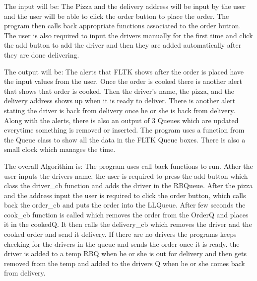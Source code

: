 \begin{DoxyItemize}
\item The input will be\+: The Pizza and the delivery address will be input by the user and the user will be able to click the order button to place the order. The program then calls back appropriate functions associated to the order button. The user is also required to input the drivers manually for the first time and click the add button to add the driver and then they are added automatically after they are done delivering.\end{DoxyItemize}
\begin{DoxyItemize}
\item The output will be\+: The alerts that F\+L\+T\+K shows after the order is placed have the input values from the user. Once the order is cooked there is another alert that shows that order is cooked. Then the driver's name, the pizza, and the delivery address shows up when it is ready to deliver. There is another alert stating the driver is back from delivery once he or she is back from delivery. Along with the alerts, there is also an output of 3 Queues which are updated everytime something is removed or inserted. The program uses a function from the Queue class to show all the data in the F\+L\+T\+K Queue boxes. There is also a small clock which manages the time.\end{DoxyItemize}
\begin{DoxyItemize}
\item The overall Algorithim is\+: The program uses call back functions to run. Ather the user inputs the drivers name, the user is required to press the add button which class the driver\+\_\+cb function and adds the driver in the R\+B\+Queue. After the pizza and the address input the user is required to click the order button, which calls back the order\+\_\+cb and puts the order into the L\+L\+Queue. After few seconds the cook\+\_\+cb function is called which removes the order from the Order\+Q and places it in the cooked\+Q. It then calls the delivery\+\_\+cb which removes the driver and the cooked order and send it delivery. If there are no drivers the programs keeps checking for the drivers in the queue and sends the order once it is ready. the driver is added to a temp R\+B\+Q when he or she is out for delivery and then gets removed from the temp and added to the drivers Q when he or she comes back from delivery. \end{DoxyItemize}
